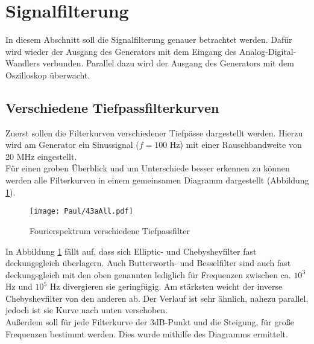 \section{Signalfilterung}
In diesem Abschnitt soll die Signalfilterung genauer betrachtet werden. Dafür wird wieder der Ausgang des Generators mit dem Eingang des Analog-Digital-Wandlers verbunden. Parallel dazu wird der Ausgang des Generators mit dem Oszilloskop überwacht.

\subsection{Verschiedene Tiefpassfilterkurven}
\label{sec:VerTi}
Zuerst sollen die Filterkurven verschiedener Tiefpässe dargestellt werden. Hierzu wird am Generator ein Sinussignal ($f=100$ Hz) mit einer Rauschbandweite von 20 MHz eingestellt.\\

Für einen groben Überblick und um Unterschiede besser erkennen zu können werden alle Filterkurven in einem gemeinsamen Diagramm dargestellt (Abbildung \ref{fig:43aAll}). \\

\begin{figure}[h]
    \centering
    \texttt{[image: Paul/43aAll.pdf]}
    \caption{Fourierspektrum verschiedene Tiefpassfilter}
    \label{fig:43aAll}
\end{figure}

In Abbildung \ref{fig:43aAll} fällt auf, dass sich Elliptic- und Chebyshevfilter fast deckungsgleich überlagern. Auch Butterworth- und Besselfilter sind auch fast deckungsgleich mit den oben genannten lediglich für Frequenzen zwischen ca. $10^3$ Hz und $10^5$ Hz divergieren sie geringfügig. Am stärksten weicht der inverse Chebyshevfilter von den anderen ab. Der Verlauf ist sehr ähnlich, nahezu parallel, jedoch ist sie Kurve nach unten verschoben. \\

\newpage
Außerdem soll  für jede Filterkurve der 3dB-Punkt und die Steigung, für große Frequenzen bestimmt werden.
Dies wurde mithilfe des Diagramms ermittelt.

